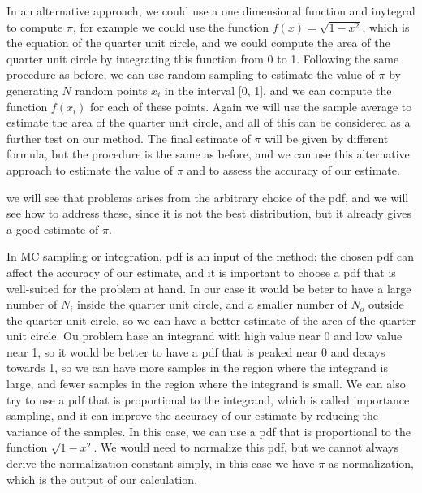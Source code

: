 In an alternative approach, we could use a one dimensional function and inytegral to compute \(\pi\), for example we could use the function \(f(x) = \sqrt{1-x^2}\), which is the equation of the quarter unit circle, and we could compute the area of the quarter unit circle by integrating this function from 0 to 1. Following the same procedure as before, we can use random sampling to estimate the value of \(\pi\) by generating \(N\) random points \(x_i\) in the interval [0, 1], and we can compute the function \(f(x_i)\) for each of these points. Again we will use the sample average to estimate the area of the quarter unit circle, and all of this can be considered as a further test on our method. The final estimate of \(\pi\) will be given by different formula, but the procedure is the same as before, and we can use this alternative approach to estimate the value of \(\pi\) and to assess the accuracy of our estimate.

we will see that problems arises from the arbitrary choice of the pdf, and we will see how to address these, since it is not the best distribution, but it already gives a good estimate of \(\pi\).









In MC sampling or integration, pdf is an input of the method: the chosen pdf can affect the accuracy of our estimate, and it is important to choose a pdf that is well-suited for the problem at hand. In our case it would be beter to have a large number of \(N_i\) inside the quarter unit circle, and a smaller number of \(N_o\) outside the quarter unit circle, so we can have a better estimate of the area of the quarter unit circle. Ou problem hase an integrand with high value near 0 and low value near 1, so it would be better to have a pdf that is peaked near 0 and decays towards 1, so we can have more samples in the region where the integrand is large, and fewer samples in the region where the integrand is small. We can also try to use a pdf that is proportional to the integrand, which is called importance sampling, and it can improve the accuracy of our estimate by reducing the variance of the samples. In this case, we can use a pdf that is proportional to the function \(\sqrt{1-x^2}\). We would need to normalize this pdf, but we cannot always derive the normalization constant simply, in this case we have \(\pi\) as normalization, which is the output of our calculation.

